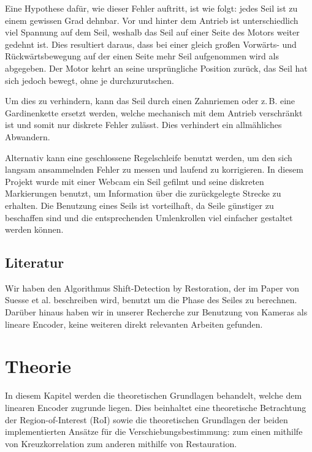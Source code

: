 \documentclass[10pt,a4paper]{scrarticle}
\begin{document}
Eine Hypothese dafür, wie dieser Fehler auftritt, ist wie folgt: jedes Seil ist zu einem gewissen Grad dehnbar. Vor und hinter dem Antrieb ist unterschiedlich viel Spannung auf dem Seil, weshalb 
das Seil auf einer Seite des Motors weiter gedehnt ist. Dies resultiert daraus, dass bei einer gleich großen Vorwärts- und Rückwärtsbewegung auf der einen Seite mehr Seil aufgenommen wird als abgegeben. Der Motor kehrt an seine ursprüngliche Position zurück, das Seil hat sich jedoch bewegt, ohne je durchzurutschen.

Um dies zu verhindern, kann das Seil durch einen Zahnriemen oder z.\,B. eine Gardinenkette ersetzt werden, welche mechanisch mit dem Antrieb verschränkt ist und somit nur diskrete Fehler zulässt. Dies verhindert ein allmähliches Abwandern.

Alternativ kann eine geschlossene Regelschleife benutzt werden, um den sich langsam ansammelnden Fehler zu messen und laufend zu korrigieren. In diesem Projekt wurde mit einer Webcam ein Seil gefilmt und seine diskreten Markierungen benutzt, um Information über die zurückgelegte Strecke zu erhalten. Die Benutzung eines Seils ist vorteilhaft, da Seile günstiger zu beschaffen sind und die entsprechenden Umlenkrollen viel einfacher gestaltet werden können.





\subsection{Literatur}
    Wir haben den Algorithmus Shift-Detection by Restoration, der im Paper von Suesse et al. \cite{suesse1999shift} beschreiben wird, benutzt um die Phase des Seiles zu berechnen. Darüber hinaus haben wir in unserer Recherche zur Benutzung von Kameras als lineare Encoder, keine weiteren direkt relevanten Arbeiten gefunden.

\section{Theorie}
    In diesem Kapitel werden die theoretischen Grundlagen behandelt, welche dem linearen Encoder zugrunde liegen. Dies beinhaltet eine theoretische Betrachtung der Region-of-Interest (RoI) sowie die theoretischen Grundlagen der beiden implementierten Ansätze für die Verschiebungsbestimmung: zum einen mithilfe von Kreuzkorrelation zum anderen mithilfe von Restauration.
    
\end{document}

